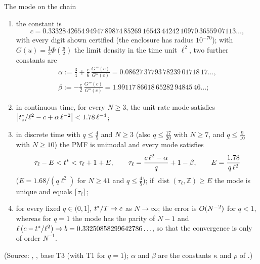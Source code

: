 \begin{catheorem}{The mode on the chain}\label{s6b_rigorous:thm-1d}
\begin{enumerate}
\item[(a)] the constant is
\[
c=0.33328\,42654\,94947\,89874\,85269\,16543\,44242\,10970\,36559\,07113\ldots ,
\]
with every digit shown certified (the enclosure has radius $10^{-70}$); with $G(u)=\frac12\Phi(\frac u2)$ the limit
density in the time unit $\ell^{2}$, two further constants are
\begin{gather*}
\alpha:=\frac34+\frac c6\,\frac{G'''(c)}{G''(c)}=0.08627\,37793\,78239\,01718\,17\ldots,\\
\beta:=-\frac c2\,\frac{G'''(c)}{G''(c)}=1.99117\,86618\,65282\,94845\,46\ldots;
\end{gather*}
\item[(b)] in continuous time, for every $N\ge3$, the unit-rate mode satisfies
$\bigl|t^{*}_{\mathrm{c}}/\ell^{2}-c+\alpha\,\ell^{-2}\bigr|<1.78\,\ell^{-4}$;
\item[(c)] in discrete time with $q\le\frac45$ and $N\ge3$ (also $q\le\frac{17}{20}$ with $N\ge7$, and $q\le\frac9{10}$
with $N\ge10$) the PMF is unimodal and every mode satisfies
\[
\tau_\ell-E<t^{*}<\tau_\ell+1+E,\qquad \tau_\ell=\frac{c\,\ell^{2}-\alpha}{q}+1-\beta,\qquad E=\frac{1.78}{q\,\ell^{2}}
\]
($E=1.68/(q\ell^{2})$ for $N\ge41$ and $q\le\frac45$); if $\operatorname{dist}(\tau_\ell,\mathbb Z)\ge E$ the mode is
unique and equals $\lceil\tau_\ell\rceil$;
\item[(d)] for every fixed $q\in(0,1]$, $t^{*}/T\to c$ as $N\to\infty$; the error is $O(N^{-2})$ for $q<1$,
whereas for $q=1$ the mode has the parity of $N-1$ and $\ell\,(c-t^{*}/\ell^{2})\to b=0.33250858299642786\ldots$,
so that the convergence is only of order $N^{-1}$.
\end{enumerate}
\textup{(Source: , , base T3 (with T1 for $q=1$);
$\alpha$ and $\beta$ are the constants $\kappa$ and $\rho$ of .)}
\end{catheorem}

